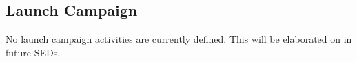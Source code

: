 \pagebreak
\subsection{Launch Campaign}
No launch campaign activities are currently defined. This will be elaborated on in future SEDs.